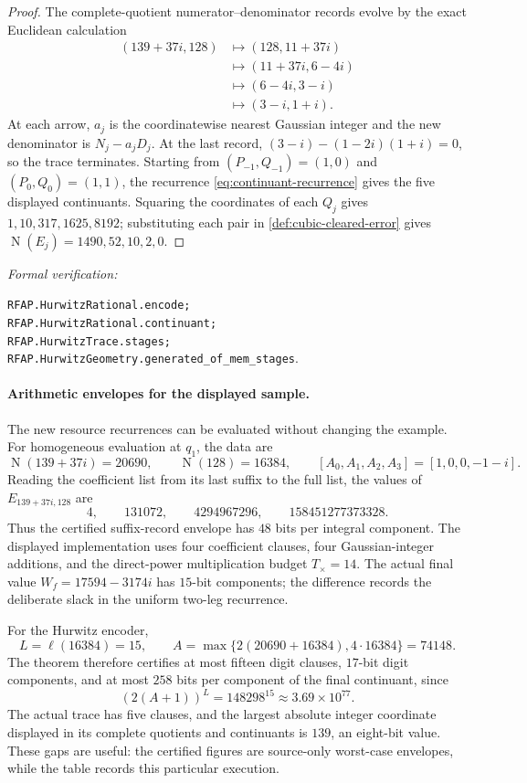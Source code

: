 \documentclass[11pt]{article}
\newcommand{\Norm}[1]{\operatorname{N}\!\left(#1\right)}
\newcommand{\leanref}[1]{\par\smallskip\noindent
  \emph{Formal verification:}\par\nobreak
  {\raggedright\nolinkurl{#1}.\par}}
\begin{document}
\begin{proof}
The complete-quotient numerator--denominator records evolve by the exact
Euclidean calculation
\[
 \begin{aligned}
 (139+37i,128)&\longmapsto(128,11+37i)\\
 &\longmapsto(11+37i,6-4i)\\
 &\longmapsto(6-4i,3-i)\\
 &\longmapsto(3-i,1+i).
 \end{aligned}
\]
At each arrow, $a_j$ is the coordinatewise nearest Gaussian integer and the
new denominator is $N_j-a_jD_j$.  At the last record,
$(3-i)-(1-2i)(1+i)=0$, so the trace terminates.  Starting from
$(P_{-1},Q_{-1})=(1,0)$ and $(P_0,Q_0)=(1,1)$, the recurrence
\eqref{eq:continuant-recurrence} gives the five displayed continuants.
Squaring the coordinates of each $Q_j$ gives
$1,10,317,1625,8192$; substituting each pair in
\cref{def:cubic-cleared-error} gives
$\Norm{E_j}=1490,52,10,2,0$.
\end{proof}

\leanref{RFAP.HurwitzRational.encode;
RFAP.HurwitzRational.continuant;
RFAP.HurwitzTrace.stages;
RFAP.HurwitzGeometry.generated_of_mem_stages}

\paragraph{Arithmetic envelopes for the displayed sample.}
The new resource recurrences can be evaluated without changing the example.
For homogeneous evaluation at $q_1$, the data are
\[
 \Norm{139+37i}=20690,\qquad \Norm{128}=16384,\qquad
 [A_0,A_1,A_2,A_3]=[1,0,0,-1-i].
\]
Reading the coefficient list from its last suffix to the full list, the
values of $E_{139+37i,128}$ are
\[
 4,\qquad 131072,\qquad 4294967296,\qquad
 158451277373328.
\]
Thus the certified suffix-record envelope has $48$ bits per integral
component.  The displayed implementation uses four coefficient clauses,
four Gaussian-integer additions, and the direct-power multiplication budget
$T_{\times}=14$.  The actual final value
$W_f=17594-3174i$ has $15$-bit components; the difference records the
deliberate slack in the uniform two-leg recurrence.

For the Hurwitz encoder,
\[
 L=\ell(16384)=15,\qquad
 A=\max\{2(20690+16384),4\cdot16384\}=74148.
\]
The theorem therefore certifies at most fifteen digit clauses, $17$-bit
digit components, and at most $258$ bits per component of the final
continuant, since
\[
 (2(A+1))^L=148298^{15}
 \approx3.69\mathbin{\times}10^{77}.
\]
The actual trace has five clauses, and the largest absolute integer
coordinate displayed in its complete quotients and continuants is $139$, an
eight-bit value.  These gaps are useful: the certified figures are
source-only worst-case envelopes, while the table records this particular
execution.
\end{document}
